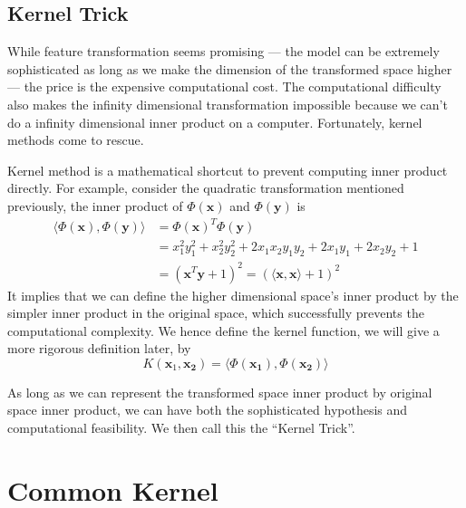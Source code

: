 \documentclass[12pt]{article}
\theoremstyle{definition}
\theoremstyle{remark}
\begin{document}
\subsection{Kernel Trick}
While feature transformation seems promising --- the model can be extremely sophisticated as long as we make the dimension of the transformed space higher --- the price is the expensive computational cost. The computational difficulty also makes the infinity dimensional transformation impossible because we can't do a infinity dimensional inner product on a computer. Fortunately, kernel methods come to rescue.

Kernel method is a mathematical shortcut to prevent computing inner product directly. For example, consider the quadratic transformation mentioned previously, the inner product of \(\Phi(\mathbf{x})\) and \(\Phi(\mathbf{y})\) is
\begin{align*}
  \langle \Phi(\mathbf{x}), \Phi(\mathbf{y}) \rangle &= {\Phi(\mathbf{x})}^T \Phi(\mathbf{y}) \\
      &= x_1^2 y_1^2 + x_2^2 y_2^2 + 2 x_1 x_2 y_1 y_2 + 2 x_1 y_1 + 2 x_2 y_2 + 1 \\
      &= {(\mathbf{x}^T\mathbf{y} + 1)}^2 = {(\langle \mathbf{x}, \mathbf{x} \rangle + 1)}^2
\end{align*}
It implies that we can define the higher dimensional space's inner product by the simpler inner product in the original space, which successfully prevents the computational complexity. We hence define the kernel function, we will give a more rigorous definition later, by
\[
  K(\mathbf{x}_1, \mathbf{x_2}) = \langle \Phi(\mathbf{x_1}), \Phi(\mathbf{x_2}) \rangle
\]

As long as we can represent the transformed space inner product by original space inner product, we can have both the sophisticated hypothesis and computational feasibility. We then call this the ``Kernel Trick''.

\section{Common Kernel}
\end{document}
